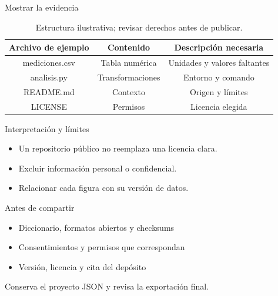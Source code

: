 \documentclass[aspectratio=169,11pt]{beamer}
\begin{document}
\begin{frame}{Mostrar la evidencia}
  \transdissolve[duration=0.25]
  \begin{table}
    \centering
    \caption{Estructura ilustrativa; revisar derechos antes de publicar.}
    \begin{tabular}{ccc}
      \toprule
      \textbf{Archivo de ejemplo} & \textbf{Contenido} & \textbf{Descripción necesaria} \\
      \midrule
      mediciones.csv & Tabla numérica & Unidades y valores faltantes \\
      analisis.py & Transformaciones & Entorno y comando \\
      README.md & Contexto & Origen y límites \\
      LICENSE & Permisos & Licencia elegida \\
      \bottomrule
    \end{tabular}
  \end{table}
\end{frame}

\begin{frame}{Interpretación y límites}
  \transdissolve[duration=0.25]
  \begin{itemize}
    \item Un repositorio público no reemplaza una licencia clara.
    \item Excluir información personal o confidencial.
    \item Relacionar cada figura con su versión de datos.
  \end{itemize}
\end{frame}

\begin{frame}{Antes de compartir}
  \transdissolve[duration=0.25]
  \begin{itemize}
    \item Diccionario, formatos abiertos y checksums
    \item Consentimientos y permisos que correspondan
    \item Versión, licencia y cita del depósito
  \end{itemize}
  \medskip

  {\small Conserva el proyecto JSON y revisa la exportación final.}
\end{frame}
\end{document}
